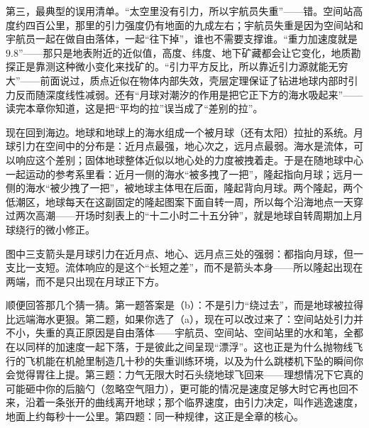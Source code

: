 第三，最典型的误用清单。“太空里没有引力，所以宇航员失重”——错。空间站高度约四百公里，那里的引力强度仍有地面的九成左右；宇航员失重是因为空间站和宇航员一起在做自由落体，一起“往下掉”，谁也不需要支撑谁。“重力加速度就是 \(9.8\)”——那只是地表附近的近似值，高度、纬度、地下矿藏都会让它变化，地质勘探正是靠测这种微小变化来找矿的。“引力平方反比，所以靠近引力源就能无穷大”——前面说过，质点近似在物体内部失效，壳层定理保证了钻进地球内部时引力反而随深度线性减弱。还有“月球对潮汐的作用是把它正下方的海水吸起来”——读完本章你知道，这是把“平均的拉”误当成了“差别的拉”。


现在回到海边。地球和地球上的海水组成一个被月球（还有太阳）拉扯的系统。月球引力在空间中的分布是：近月点最强，地心次之，远月点最弱。海水是流体，可以响应这个差别；固体地球整体近似以地心处的力度被拽着走。于是在随地球中心一起运动的参考系里看：近月一侧的海水“被多拽了一把”，隆起指向月球；远月一侧的海水“被少拽了一把”，被地球主体甩在后面，隆起背向月球。两个隆起，两个低潮区，地球每天在这副固定的隆起图案下面自转一周，所以每个沿海地点一天穿过两次高潮——开场时刻表上的“十二小时二十五分钟”，就是地球自转周期加上月球绕行的微小修正。

\begin{center}
\end{center}

图中三支箭头是月球引力在近月点、地心、远月点三处的强弱：都指向月球，但一支比一支短。流体响应的是这个“长短之差”，而不是箭头本身——所以隆起出现在两端，而不是只出现在月球正下方。

顺便回答那几个猜一猜。第一题答案是（b）：不是引力“绕过去”，而是地球被拉得比远端海水更狠。第二题，如果你选了（a），现在可以改过来了：空间站处引力并不小，失重的真正原因是自由落体——宇航员、空间站、空间站里的水和笔，全都在以同样的加速度一起下落，于是彼此之间呈现“漂浮”。这也正是为什么抛物线飞行的飞机能在机舱里制造几十秒的失重训练环境，以及为什么跳楼机下坠的瞬间你会觉得胃往上提。第三题：力气无限大时石头绕地球飞回来——理想情况下它真的可能砸中你的后脑勺（忽略空气阻力），更可能的情况是速度足够大时它再也回不来，沿着一条张开的曲线离开地球；那个临界速度，由引力决定，叫作逃逸速度，地面上约每秒十一公里。第四题：同一种规律，这正是全章的核心。

